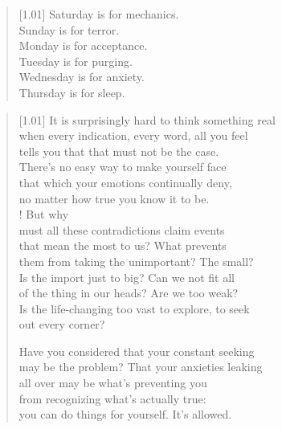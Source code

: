 \null
\vfill
\begin{verse}[1.01\textwidth]
  Saturday is for mechanics.\\
  Sunday is for terror.\\
  Monday is for acceptance.\\
  Tuesday is for purging.\\
  Wednesday is for anxiety.\\
  Thursday is for sleep.
\end{verse}
\vfill

\newpage

\begin{verse}[1.01\textwidth]
  It is surprisingly hard to think something real\\
  when every indication, every word, all you feel\\
  tells you that that must not be the case.\\
  There's no easy way to make yourself face\\
  that which your emotions continually deny,\\
  no matter how true you know it to be.\\!
   But why\\
  must all these contradictions claim events\\
  that mean the most to us? What prevents\\
  them from taking the unimportant? The small?\\
  Is the import just to big? Can we not fit all\\
  of the thing in our heads? Are we too weak?\\
  Is the life-changing too vast to explore, to seek\\
  out every corner?

\begin{ally}
  \noindent Have you considered that your constant seeking\\
  \noindent may be the problem? That your anxieties leaking\\
  \noindent all over may be what's preventing you\\
  \noindent from recognizing what's actually true:\\
  \noindent you can do things for yourself. It's allowed.
\end{ally}


\end{verse}
